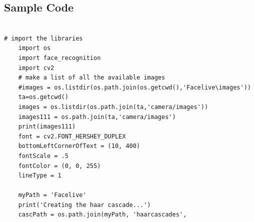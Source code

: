 \documentclass[a4paper, 12pt]{report}
\begin{document}
\subsection{Sample Code}
\begin{lstlisting}

# import the libraries
	import os
	import face_recognition
	import cv2
	# make a list of all the available images
	#images = os.listdir(os.path.join(os.getcwd(),'Facelive\images'))
	ta=os.getcwd()
	images = os.listdir(os.path.join(ta,'camera/images'))
	images111 = os.path.join(ta,'camera/images')
	print(images111)
	font = cv2.FONT_HERSHEY_DUPLEX
	bottomLeftCornerOfText = (10, 400)
	fontScale = .5
	fontColor = (0, 0, 255)
	lineType = 1

	myPath = 'Facelive'
	print('Creating the haar cascade...')
	cascPath = os.path.join(myPath, 'haarcascades',
\end{lstlisting}
\end{document}
